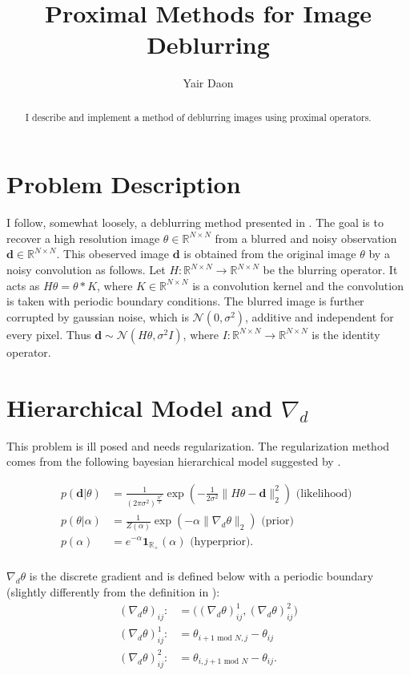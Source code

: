 \documentclass[paper=a4, fontsize=11pt]{scrartcl} %
\title{Proximal Methods for Image Deblurring}
\author{Yair Daon}
\date{}
\numberwithin{equation}{section} %
\numberwithin{figure}{section} %
\numberwithin{table}{section} %
\newcommand{\data}{\mathbf{d}}
\newcommand{\param}{\theta}
\newcommand{\grad}{\nabla_{d} }
\newcommand{\modd}{\text{ mod }}
\begin{document}
\maketitle
\begin{abstract}
  I describe and implement a method of deblurring images using
  proximal operators.
\end{abstract}

\section{Problem Description}
I follow, somewhat loosely, a deblurring method presented in
\cite{green2015bayesian}. The goal is to recover a high resolution
image $\param \in \mathbb{R}^{N \times N}$ from a blurred and noisy
observation $\data \in \mathbb{R}^{N \times N}$. This obeserved image $\data$
is obtained from the original image $\param$ by a noisy convolution as
follows. Let $H: \mathbb{R}^{N \times N} \to \mathbb{R}^{N \times N}$
be the blurring operator. It acts as $H\param = \param * K$, where $K
\in \mathbb{R}^{N \times N}$ is a convolution kernel and the
convolution is taken with periodic boundary conditions.  The blurred
image is further corrupted by gaussian noise, which is $\mathcal{N}(0,
\sigma^2)$, additive and independent for every pixel. Thus $\data \sim
\mathcal{N}( H\param, \sigma^2I)$, where $I: \mathbb{R}^{N \times N}
\to \mathbb{R}^{N \times N}$ is the identity operator.

\section{Hierarchical Model and $\grad$}
This problem is ill posed and needs regularization. The regularization
method comes from the following bayesian hierarchical model suggested
by \cite{oliveira2009adaptive}.

\begin{align*}
  p(\data | \param) &= \frac{1}{ (2\pi \sigma^2)^{\frac{N^2}{2}}} \exp( -\frac{1}{2\sigma^2}\|H\param - \data \|_2^2 )
 \text{ (likelihood) }\\
  p( \param | \alpha ) &= \frac{1}{Z(\alpha)} \exp( -\alpha \|\grad\param\|_2 ) \text{ (prior) }\\
  p(\alpha) &= e^{-\alpha} \mathbf{1}_{\mathbb{R}_{+}}(\alpha) \text{ (hyperprior)}. \\
\end{align*} 

$\grad \param$ is the discrete gradient and is defined below with a
periodic boundary (slightly differently from the definition in
\cite{chambolle2004algorithm}):
\begin{align*}
  (\grad \param)_{ij} :&= \big ( (\grad \param)_{ij}^1 , ( \grad
  \param)_{ij}^2 \big ) \\
  (\grad \param)_{ij}^1 :&= \param_{i+1\modd N,j} -\param_{ij} \\
  (\grad\param)_{ij}^2 :&= \param_{i,j+1\modd N}
  -\param_{ij}.
\end{align*}
\end{document}

